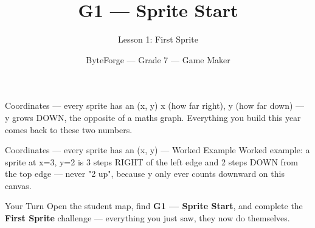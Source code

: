 \documentclass[aspectratio=169]{beamer}
\title{G1 — Sprite Start}
\subtitle{Lesson 1: First Sprite}
\author{ByteForge --- Grade 7 --- Game Maker}
\date{}
\begin{document}
\begin{frame}
    \titlepage
\end{frame}

\begin{frame}{Coordinates — every sprite has an (x, y)}
    \Large
    x (how far right), y (how far down) — y grows DOWN, the opposite of a maths graph. Everything you build this year comes back to these two numbers.

    \begin{center}
    \end{center}
\end{frame}

\begin{frame}{Coordinates — every sprite has an (x, y) --- Worked Example}
    \Large
    Worked example: a sprite at x=3, y=2 is 3 steps RIGHT of the left edge and 2 steps DOWN from the top edge — never "2 up", because y only ever counts downward on this canvas.
\end{frame}

\begin{frame}{Your Turn}
    \Large
    Open the student map, find \textbf{G1 — Sprite Start}, and complete
    the \textbf{First Sprite} challenge --- everything you just saw, they now do themselves.
\end{frame}
\end{document}
